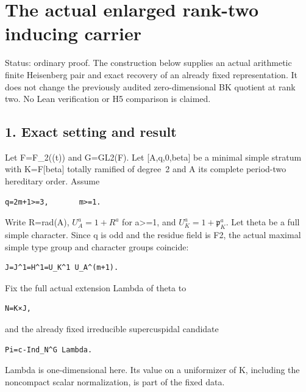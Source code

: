 \clearpage
\section{The actual enlarged rank-two inducing carrier}\label{app:rank2}

Status: ordinary proof. The construction below supplies an actual
arithmetic finite Heisenberg pair and exact recovery of an already fixed
representation. It does not change the previously audited
zero-dimensional BK quotient at rank two. No Lean verification or H5
comparison is claimed.

\hypertarget{rank2-exact-setting-and-result}{%
\subsection{1. Exact setting and
result}\label{rank2-exact-setting-and-result}}

Let F=F\_2((t)) and G=GL2(F). Let {[}A,q,0,beta{]} be a minimal simple
stratum with K=F{[}beta{]} totally ramified of degree~2 and A its
complete period-two hereditary order. Assume

\begin{Verbatim}[fontsize=\small,breaklines=true,breakanywhere=true]
q=2m+1>=3,       m>=1.
\end{Verbatim}

Write R=rad(A), \(U_A^a=1+R^a\) for a\textgreater=1, and
\(U_K^a=1+\mathfrak p_K^a\). Let theta be a full simple character.
Since q is odd and the residue field is F2, the actual maximal simple
type group and character groups coincide:

\begin{Verbatim}[fontsize=\small,breaklines=true,breakanywhere=true]
J=J^1=H^1=U_K^1 U_A^(m+1).
\end{Verbatim}

Fix the full actual extension Lambda of theta to

\begin{Verbatim}[fontsize=\small,breaklines=true,breakanywhere=true]
N=K×J,
\end{Verbatim}

and the already fixed irreducible supercuspidal candidate

\begin{Verbatim}[fontsize=\small,breaklines=true,breakanywhere=true]
Pi=c-Ind_N^G Lambda.
\end{Verbatim}

Lambda is one-dimensional here. Its value on a uniformizer of K,
including the noncompact scalar normalization, is part of the fixed
data.

